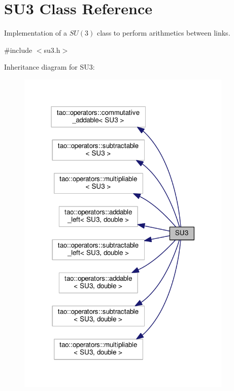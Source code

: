 \hypertarget{structSU3}{}\section{S\+U3 Class Reference}
\label{structSU3}


Implementation of a $SU(3)$ class to perform arithmetics between links.  




{\ttfamily \#include $<$su3.\+h$>$}



Inheritance diagram for S\+U3\+:\nopagebreak
\begin{figure}[H]
\begin{center}
\leavevmode
\includegraphics[width=291pt]{d0/d49/structSU3__inherit__graph}
\end{center}
\end{figure}


